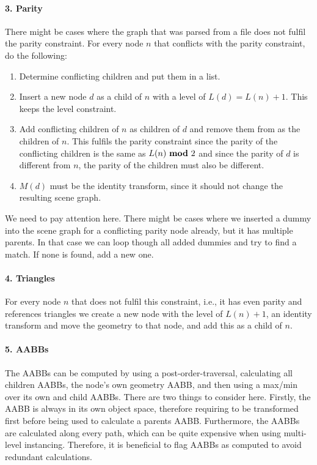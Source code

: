 \paragraph{3. Parity}
There might be cases where the graph that was parsed from a file does not fulfil the parity constraint. For every node $n$ that conflicts with the parity constraint, do the following:
\begin{enumerate}
    \item Determine conflicting children and put them in a list.
    \item Insert a new node $d$ as a child of $n$ with a level of $L(d) = L(n)+1$. This keeps the level constraint.
    \item Add conflicting children of $n$ as children of $d$ and remove them from as the children of $n$. This fulfils the parity constraint since the parity of the conflicting children is the same as $L(n) \text{ $\mathbf{mod}$ $2$}$ and since the parity of $d$ is different from $n$, the parity of the children must also be different.
    \item $M(d)$ must be the identity transform, since it should not change the resulting scene graph.
\end{enumerate}
We need to pay attention here. There might be cases where we inserted a dummy into the scene graph for a conflicting parity node already, but it has multiple parents. In that case we can loop though all added dummies and try to find a match. If none is found, add a new one.
\paragraph{4. Triangles}
For every node $n$ that does not fulfil this constraint, i.e., it has even parity and references triangles we create a new node with the level of $L(n)+1$, an identity transform and move the geometry to that node, and add this as a child of $n$.
\paragraph{5. AABBs}
The AABBs can be computed by using a post-order-traversal, calculating all children AABBs, the node's own geometry AABB, and then using a max/min over its own and child AABBs. There are two things to consider here. Firstly, the AABB is always in its own object space, therefore requiring to be transformed first before being used to calculate a parents AABB. Furthermore, the AABBs are calculated along every path, which can be quite expensive when using multi-level instancing. Therefore, it is beneficial to flag AABBs as computed to avoid redundant calculations.
\newpage
